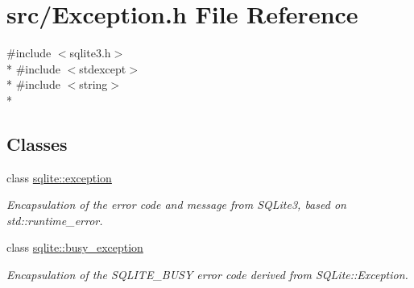 \hypertarget{a00024}{\section{src/\-Exception.h File Reference}
\label{a00024}
}
{\ttfamily \#include $<$sqlite3.\-h$>$}\\*
{\ttfamily \#include $<$stdexcept$>$}\\*
{\ttfamily \#include $<$string$>$}\\*
\subsection*{Classes}
\begin{DoxyCompactItemize}
\item 
class \hyperlink{a00006}{sqlite\-::exception}
\begin{DoxyCompactList}\small\item\em Encapsulation of the error code and message from S\-Q\-Lite3, based on std\-::runtime\-\_\-error. \end{DoxyCompactList}\item 
class \hyperlink{a00003}{sqlite\-::busy\-\_\-exception}
\begin{DoxyCompactList}\small\item\em Encapsulation of the S\-Q\-L\-I\-T\-E\-\_\-\-B\-U\-S\-Y error code derived from S\-Q\-Lite\-::\-Exception. \end{DoxyCompactList}\end{DoxyCompactItemize}
